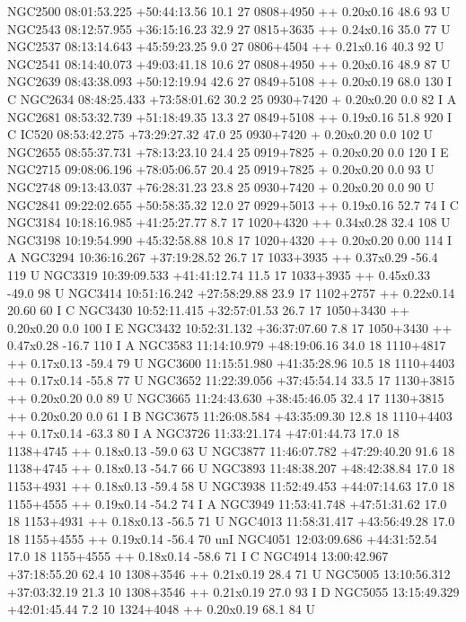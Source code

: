 NGC2500 08:01:53.225 +50:44:13.56 10.1 27 0808+4950 ++ 0.20x0.16 48.6 93 U 
NGC2543 08:12:57.955 +36:15:16.23 32.9 27 0815+3635 ++ 0.24x0.16 35.0 77 U 
NGC2537 08:13:14.643 +45:59:23.25 9.0 27 0806+4504 ++ 0.21x0.16 40.3 92 U 
NGC2541 08:14:40.073 +49:03:41.18 10.6 27 0808+4950 ++ 0.20x0.16 48.9 87 U 
NGC2639 08:43:38.093 +50:12:19.94 42.6 27 0849+5108 ++ 0.20x0.19 68.0 130 I C 
NGC2634 08:48:25.433 +73:58:01.62 30.2 25 0930+7420 + 0.20x0.20 0.0 82 I A 
NGC2681 08:53:32.739 +51:18:49.35 13.3 27 0849+5108 ++ 0.19x0.16 51.8 920 I C 
IC520 08:53:42.275 +73:29:27.32 47.0 25 0930+7420 + 0.20x0.20 0.0 102 U 
NGC2655 08:55:37.731 +78:13:23.10 24.4 25 0919+7825 + 0.20x0.20 0.0 120 I E 
NGC2715 09:08:06.196 +78:05:06.57 20.4 25 0919+7825 + 0.20x0.20 0.0 93 U 
NGC2748 09:13:43.037 +76:28:31.23 23.8 25 0930+7420 + 0.20x0.20 0.0 90 U 
NGC2841 09:22:02.655 +50:58:35.32 12.0 27 0929+5013 ++ 0.19x0.16 52.7 74 I C 
NGC3184 10:18:16.985 +41:25:27.77 8.7 17 1020+4320 ++ 0.34x0.28 32.4 108 U 
NGC3198 10:19:54.990 +45:32:58.88 10.8 17 1020+4320 ++ 0.20x0.20 0.00 114 I A 
NGC3294 10:36:16.267 +37:19:28.52 26.7 17 1033+3935 ++ 0.37x0.29 -56.4 119 U 
NGC3319 10:39:09.533 +41:41:12.74 11.5 17 1033+3935 ++ 0.45x0.33 -49.0 98 U 
NGC3414 10:51:16.242 +27:58:29.88 23.9 17 1102+2757 ++ 0.22x0.14 20.60 60 I C 
NGC3430 10:52:11.415 +32:57:01.53 26.7 17 1050+3430 ++ 0.20x0.20 0.0 100 I E 
NGC3432 10:52:31.132 +36:37:07.60 7.8 17 1050+3430 ++ 0.47x0.28 -16.7 110 I A 
NGC3583 11:14:10.979 +48:19:06.16 34.0 18 1110+4817 ++ 0.17x0.13 -59.4 79 U 
NGC3600 11:15:51.980 +41:35:28.96 10.5 18 1110+4403 ++ 0.17x0.14 -55.8 77 U 
NGC3652 11:22:39.056 +37:45:54.14 33.5 17 1130+3815 ++ 0.20x0.20 0.0 89 U 
NGC3665 11:24:43.630 +38:45:46.05 32.4 17 1130+3815 ++ 0.20x0.20 0.0 61 I B 
NGC3675 11:26:08.584 +43:35:09.30 12.8 18 1110+4403 ++ 0.17x0.14 -63.3 80 I A 
NGC3726 11:33:21.174 +47:01:44.73 17.0 18 1138+4745 ++ 0.18x0.13 -59.0 63 U 
NGC3877 11:46:07.782 +47:29:40.20 91.6 18 1138+4745 ++ 0.18x0.13 -54.7 66 U 
NGC3893 11:48:38.207 +48:42:38.84 17.0 18 1153+4931 ++ 0.18x0.13 -59.4 58 U 
NGC3938 11:52:49.453 +44:07:14.63 17.0 18 1155+4555 ++ 0.19x0.14 -54.2 74 I A 
NGC3949 11:53:41.748 +47:51:31.62 17.0 18 1153+4931 ++ 0.18x0.13 -56.5 71 U 
NGC4013 11:58:31.417 +43:56:49.28 17.0 18 1155+4555 ++ 0.19x0.14 -56.4 70 unI 
NGC4051 12:03:09.686 +44:31:52.54 17.0 18 1155+4555 ++ 0.18x0.14 -58.6 71 I C 
NGC4914 13:00:42.967 +37:18:55.20 62.4 10 1308+3546 ++ 0.21x0.19 28.4 71 U 
NGC5005 13:10:56.312 +37:03:32.19 21.3 10 1308+3546 ++ 0.21x0.19 27.0 93 I D 
NGC5055 13:15:49.329 +42:01:45.44 7.2 10 1324+4048 ++ 0.20x0.19 68.1 84 U 
